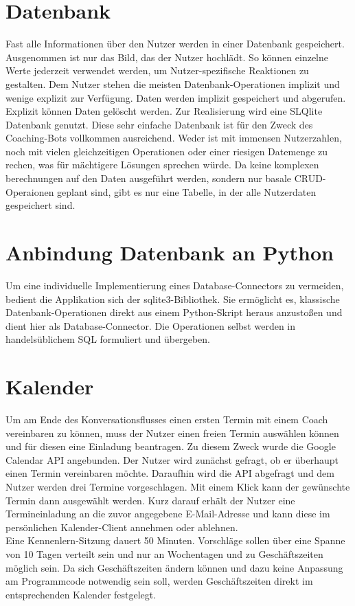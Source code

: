     \section{Datenbank}
        Fast alle Informationen über den Nutzer werden in einer Datenbank gespeichert. Ausgenommen ist nur das Bild, das der Nutzer hochlädt. So können einzelne Werte jederzeit verwendet werden, um Nutzer-spezifische Reaktionen zu gestalten.
        Dem Nutzer stehen die meisten Datenbank-Operationen implizit und wenige explizit zur Verfügung. Daten werden implizit gespeichert und abgerufen. Explizit können Daten gelöscht werden. Zur Realisierung wird eine SLQlite Datenbank genutzt. Diese sehr einfache Datenbank ist für den Zweck des Coaching-Bots vollkommen ausreichend. Weder ist mit immensen Nutzerzahlen, noch mit vielen gleichzeitigen Operationen oder einer riesigen Datemenge zu rechen, was für mächtigere Lösungen sprechen würde.
        Da keine komplexen berechnungen auf den Daten ausgeführt werden, sondern nur basale CRUD-Operaionen geplant sind, gibt es nur eine Tabelle, in der alle Nutzerdaten gespeichert sind.


    \section{Anbindung Datenbank an Python}
        Um eine individuelle Implementierung eines Database-Connectors zu vermeiden, bedient die Applikation sich der sqlite3-Bibliothek. Sie ermöglicht es, klassische Datenbank-Operationen direkt aus einem Python-Skript heraus anzustoßen und dient hier als Database-Connector. Die Operationen selbst werden in handelsüblichem SQL formuliert und übergeben.


    \section{Kalender}
        Um am Ende des Konversationsflusses einen ersten Termin mit einem Coach vereinbaren zu können, muss der Nutzer einen freien Termin auswählen können und für diesen eine Einladung beantragen. Zu diesem Zweck wurde die Google Calendar API angebunden. Der Nutzer wird zunächst gefragt, ob er überhaupt einen Termin vereinbaren möchte. Daraufhin wird die API abgefragt und dem Nutzer werden drei Termine vorgeschlagen. Mit einem Klick kann der gewünschte Termin dann ausgewählt werden. Kurz darauf erhält der Nutzer eine Termineinladung an die zuvor angegebene E-Mail-Adresse und kann diese im persönlichen Kalender-Client annehmen oder ablehnen. \\
        Eine Kennenlern-Sitzung dauert 50 Minuten. Vorschläge sollen über eine Spanne von 10 Tagen verteilt sein und nur an Wochentagen und zu Geschäftszeiten möglich sein. Da sich Geschäftszeiten ändern können und dazu keine Anpassung am Programmcode notwendig sein soll, werden Geschäftszeiten direkt im entsprechenden Kalender festgelegt.

